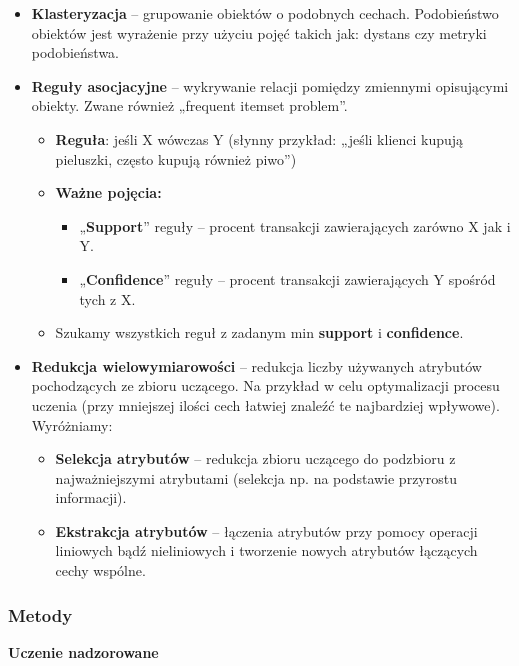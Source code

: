 \begin{itemize}
	\item \textbf{Klasteryzacja} – grupowanie obiektów o podobnych cechach. Podobieństwo obiektów jest wyrażenie przy użyciu pojęć takich jak: dystans czy metryki podobieństwa.
	\item \textbf{Reguły  asocjacyjne} – wykrywanie  relacji  pomiędzy zmiennymi opisującymi obiekty. Zwane również „frequent itemset problem”. 
	\begin{itemize}
		\item \textbf{Reguła}: jeśli X wówczas Y (słynny przykład: „jeśli klienci kupują pieluszki, często kupują również piwo”)
		\item \textbf{Ważne pojęcia:}
			\begin{itemize}
				\item „\textbf{Support}” reguły – procent transakcji zawierających zarówno X jak i Y.
				\item „\textbf{Confidence}” reguły – procent transakcji zawierających Y spośród tych z X.
			\end{itemize}
		\item Szukamy wszystkich reguł z zadanym min \textbf{support} i \textbf{confidence}.
	\end{itemize}
	\item \textbf{Redukcja wielowymiarowości} – redukcja liczby używanych atrybutów pochodzących ze zbioru uczącego. Na przykład w celu optymalizacji  procesu uczenia (przy mniejszej ilości cech łatwiej znaleźć te najbardziej wpływowe). Wyróżniamy: 
	\begin{itemize}
		\item \textbf{Selekcja atrybutów} – redukcja zbioru uczącego do podzbioru z najważniejszymi atrybutami (selekcja np. na podstawie przyrostu informacji).
		\item \textbf{Ekstrakcja  atrybutów} – łączenia  atrybutów  przy  pomocy operacji liniowych bądź nieliniowych i tworzenie nowych atrybutów łączących cechy wspólne.
	\end{itemize}
\end{itemize}

\subsubsection{Metody}

\centerline{\textbf{Uczenie nadzorowane}}

